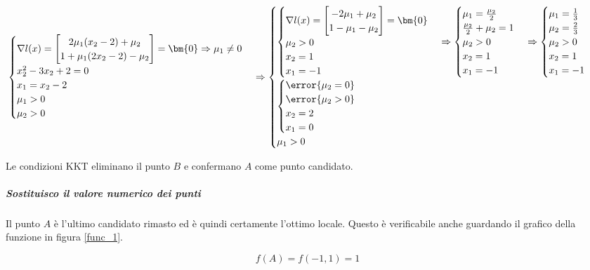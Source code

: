 \documentclass[\main/main.tex]{subfiles}
\begin{document}
\[
  \begin{cases}
    \nabla l(x) = \begin{bmatrix}
      2\mu_1(x_2 - 2) + \mu_2 \\
      1 + \mu_1 (2x_2 - 2) - \mu_2
    \end{bmatrix}
    = \bm{0}  \Rightarrow \mu_1 \neq 0 \\
    x_2^2  -3x_2 + 2 = 0               \\
    x_1 = x_2 - 2                      \\
    \mu_1 > 0                          \\
    \mu_2 > 0
  \end{cases}
  \Rightarrow
  \begin{cases}
    \begin{cases}
      \nabla l(x) = \begin{bmatrix}
        -2\mu_1 + \mu_2 \\
        1 - \mu_1 - \mu_2
      \end{bmatrix}
      = \bm{0}  \\
      \mu_2 > 0 \\
      x_2 = 1   \\
      x_1 = -1
    \end{cases}
    \Rightarrow
    \begin{cases}
      \mu_1 = \frac{\mu_2}{2}     \\
      \frac{\mu_2}{2} + \mu_2 = 1 \\
      \mu_2 > 0                   \\
      x_2 = 1                     \\
      x_1 = -1
    \end{cases}
    \Rightarrow
    \begin{cases}
      \mu_1 = \frac{1}{3} \\
      \mu_2 = \frac{2}{3} \\
      \mu_2 > 0           \\
      x_2 = 1             \\
      x_1 = -1
    \end{cases}
    \\
    \begin{cases}
      \error{\mu_2 = 0} \\
      \error{\mu_2 > 0} \\
      x_2 = 2           \\
      x_1 = 0
    \end{cases} \\
    \mu_1 > 0                  \\
  \end{cases}
\]

Le condizioni KKT eliminano il punto $B$ e confermano $A$ come punto candidato.

\subparagraph*{Sostituisco il valore numerico dei punti}
Il punto $A$ è l'ultimo candidato rimasto ed è quindi certamente l'ottimo locale. Questo è verificabile anche guardando il grafico della funzione in figura \ref{func_1}.

\[
  f(A) = f(-1, 1) = 1
\]
\end{document}
